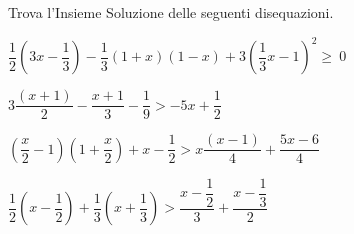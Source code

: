 \begin{esercizio}[\Ast]
 \label{ese:21.15}
Trova l'Insieme Soluzione delle seguenti disequazioni.
 \begin{enumeratea}
 \item $\dfrac{1}{2}\left(3x-\dfrac{1}{3}\right)-\dfrac{1}{3}(1+x)(1-x)+3\left(\dfrac{1}{3}x-1\right)^{2}\ge~0$
\item $3\dfrac{(x+1)}{2}-\dfrac{x+1}{3}-\dfrac{1}{9}>-5x+\dfrac{1}{2}$
\item $\left(\dfrac{x}{2}-1\right)\left(1+\dfrac{x}{2}\right)+x-\dfrac{1}{2}>x\dfrac{(x-1)}{4}+\dfrac{5x-6}{4}$
\item $\dfrac{1}{2}\left(x-\dfrac{1}{2}\right)+\dfrac{1}{3}\left(x+\dfrac{1}{3}\right)>\dfrac{x-\dfrac{1}{2}}{3}+\dfrac{x-\dfrac{1}{3}}{2}$
\end{enumeratea}
\end{esercizio}
